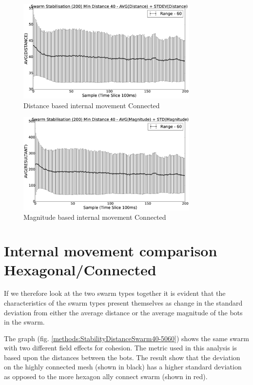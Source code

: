 \documentclass[10pt,journal,letterpaper,twoside]{IEEEtran}
\newcommand{\swarmA}{Hexagonal}
\newcommand{\swarmB}{Connected}
\newcommand{\stability}{internal movement}
\newcommand{\Stability}{Internal movement}
\newcommand{\Fig}{fig.}
\begin{document}
\begin{figure}[H]
\begin{center}
\includegraphics[width=9cm]{figures/StabilityDistanceSwarm40-60}
\end{center}
\caption{Distance based \stability{} \swarmB{}\label{methods:StabilityDistanceSwarm40-60}}
\end{figure}

\begin{figure}[H]
\begin{center}
\includegraphics[width=9cm]{figures/StabilityMagnitudeSwarm40-60}
\end{center}
\caption{Magnitude based \stability{} \swarmB{}\label{methods:StabilityMagnitudeSwarm40-60}}
\end{figure}

\section{\Stability{} comparison \swarmA{}/\swarmB{}\label{section:stabilityComparison}}

If we therefore look at the two swarm types together it is evident
that the characteristics of the swarm types present themselves as
change in the standard deviation from either the average distance or
the average magnitude of the bots in the swarm.

The graph (\Fig{} \ref{methods:StabilityDistanceSwarm40-5060}) shows
the same swarm with two different field effects for cohesion. The
metric used in this analysis is based upon the distances between the
bots. The result show that the deviation on the highly connected mesh
(shown in black) has a higher standard deviation as opposed to the
more hexagon ally connect swarm (shown in red).
\end{document}
